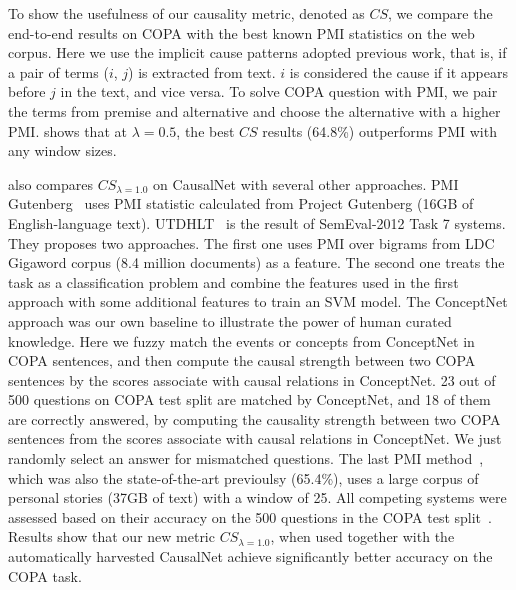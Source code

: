 To show the usefulness of our causality metric, denoted as $CS$, 
we compare the end-to-end results on COPA with the 
best known PMI statistics on the web corpus. Here we use the 
implicit cause patterns adopted previous work, that is, if a pair of
terms ($i$, $j$) is extracted from text. $i$ is considered the cause
if it appears before $j$ in the text, and vice versa.
To solve COPA question with PMI, we pair the terms from
premise and alternative and choose the alternative 
with a higher PMI.
 shows that at
$\lambda = 0.5$, the best $CS$ results
(64.8\%) outperforms PMI with any window sizes.

 also compares $CS_{\lambda=1.0}$ on CausalNet 
with several other approaches. 
PMI Gutenberg~\cite{roemmele2011choice} uses PMI statistic calculated 
from Project Gutenberg (16GB of English-language text). 
UTDHLT~\cite{goodwin2012utdhlt} is the
result of SemEval-2012 Task 7 systems. They proposes two
approaches. The first one uses PMI over bigrams from LDC Gigaword corpus
(8.4 million documents) as a
feature. The second one treats the task as a classification
problem and combine the features used in the first approach with
some additional features to train an SVM model. 
The ConceptNet approach was our own baseline to illustrate the power of
human curated knowledge. Here we fuzzy match
the events or concepts from ConceptNet in COPA sentences, and then compute
the causal strength between two COPA sentences by the scores associate with
causal relations in ConceptNet. 
23 out of 500 questions 
on COPA test split are matched by ConceptNet, 
and 18 of them are correctly answered, 
by computing the causality strength between two COPA sentences 
from the scores associate with causal relations in ConceptNet.
We just randomly select an answer 
for mismatched questions.
The last PMI method~\cite{gordon2011commonsense}, which was also the 
state-of-the-art previoulsy (65.4\%), uses a large corpus of
personal stories (37GB of text) with a window of 25.
All competing systems were assessed based
on their accuracy on the 500 questions in the COPA test
split~\cite{gordon2012copa}. Results show that our new metric 
$CS_{\lambda=1.0}$, 
when used together with the automatically harvested CausalNet 
achieve significantly better accuracy on the COPA task.

